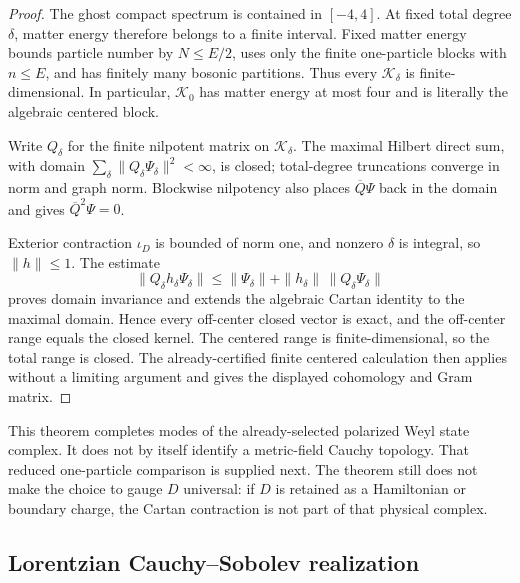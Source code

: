 \documentclass[11pt]{article}
\theoremstyle{definition}
\theoremstyle{remark}
\begin{document}
\begin{proof}
The ghost compact spectrum is contained in $[-4,4]$.  At fixed total degree
$\delta$, matter energy therefore belongs to a finite interval.  Fixed
matter energy bounds particle number by $N\le E/2$, uses only the finite
one-particle blocks with $n\le E$, and has finitely many bosonic partitions.
Thus every $\mathscr K_\delta$ is finite-dimensional.  In particular,
$\mathscr K_0$ has matter energy at most four and is literally the algebraic
centered block.

Write $Q_\delta$ for the finite nilpotent matrix on $\mathscr K_\delta$.
The maximal Hilbert direct sum, with domain
$\sum_\delta\|Q_\delta\Psi_\delta\|^2<\infty$, is closed; total-degree
truncations converge in norm and graph norm.  Blockwise nilpotency also
places $\overline Q\Psi$ back in the domain and gives
$\overline Q^2\Psi=0$.

Exterior contraction $\iota_D$ is bounded of norm one, and nonzero
$\delta$ is integral, so $\|h\|\le1$.  The estimate
\begin{equation}
 \|Q_\delta h_\delta\Psi_\delta\|
 \le \|\Psi_\delta\|+\|h_\delta\|\,
       \|Q_\delta\Psi_\delta\|
\end{equation}
proves domain invariance and extends the algebraic Cartan identity to the
maximal domain.  Hence every off-center closed vector is exact, and the
off-center range equals the closed kernel.  The centered range is
finite-dimensional, so the total range is closed.  The already-certified
finite centered calculation then applies without a limiting argument and
gives the displayed cohomology and Gram matrix.
\end{proof}

This theorem completes modes of the already-selected polarized Weyl state
complex.  It does not by itself identify a metric-field Cauchy topology.
That reduced one-particle comparison is supplied next.  The theorem still
does not make the choice to gauge $D$ universal: if $D$ is retained as a
Hamiltonian or boundary charge, the Cartan contraction is not part of that
physical complex.

\subsection{Lorentzian Cauchy--Sobolev realization}
\label{sec:cauchy-sobolev}
\end{document}
